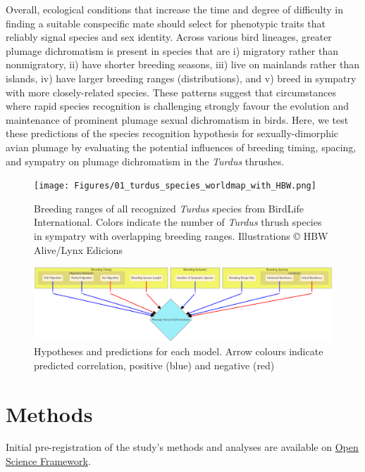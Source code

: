 \documentclass[
  a4paper,
]{article}
\begin{document}
Overall, ecological conditions that increase the time and degree of
difficulty in finding a suitable conspecific mate should select for
phenotypic traits that reliably signal species and sex identity. Across
various bird lineages, greater plumage dichromatism is present in
species that are i) migratory rather than nonmigratory, ii) have shorter
breeding seasons, iii) live on mainlands rather than islands, iv) have
larger breeding ranges (distributions), and v) breed in sympatry with
more closely-related species. These patterns suggest that circumstances
where rapid species recognition is challenging strongly favour the
evolution and maintenance of prominent plumage sexual dichromatism in
birds. Here, we test these predictions of the species recognition
hypothesis for sexually-dimorphic avian plumage by evaluating the
potential influences of breeding timing, spacing, and sympatry on
plumage dichromatism in the \emph{Turdus} thrushes.

\begin{figure}
\hypertarget{fig:fig-01-turdus-ranges}{%
\centering
\texttt{[image: Figures/01\_turdus\_species\_worldmap\_with\_HBW.png]}
\caption{Breeding ranges of all recognized \emph{Turdus} species from
BirdLife International. Colors indicate the number of \emph{Turdus}
thrush species in sympatry with overlapping breeding ranges.
Illustrations © HBW Alive/Lynx Edicions}\label{fig:fig-01-turdus-ranges}
}
\end{figure}

\begin{figure}
\hypertarget{fig:fig:02-hypotheses}{%
\centering
\includegraphics{Figures/hypothesis-figure-mermaid.png}
\caption{Hypotheses and predictions for each model. Arrow colours
indicate predicted correlation, positive (blue) and negative
(red)}\label{fig:fig:02-hypotheses}
}
\end{figure}

\hypertarget{methods}{%
\section{Methods}\label{methods}}

Initial pre-registration of the study's methods and analyses are
available on \href{https://osf.io/zum6d}{Open Science Framework}.
\end{document}
